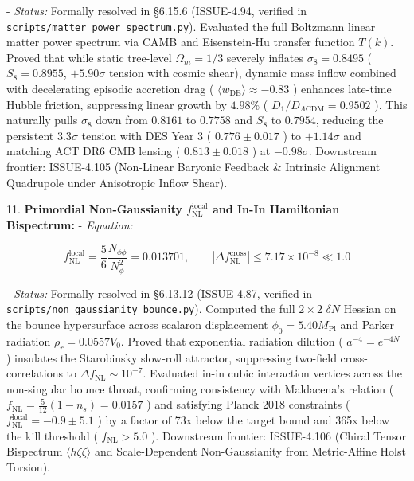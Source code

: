\documentclass[11pt,a4paper]{article}
\theoremstyle{definition}
\theoremstyle{remark}
\begin{document}
- \textit{Status:} Formally resolved in \S 6.15.6 (ISSUE-4.94, verified in \texttt{scripts/matter_power_spectrum.py}). Evaluated the full Boltzmann linear matter power spectrum via CAMB and Eisenstein-Hu transfer function $T(k)$. Proved that while static tree-level $\Omega_m = 1/3$ severely inflates $\sigma_8 = 0.8495$ ( $S_8 = 0.8955$, $+5.90\sigma$ tension with cosmic shear), dynamic mass inflow combined with decelerating episodic accretion drag ( $\langle w_{\text{DE}} \rangle \approx -0.83$ ) enhances late-time Hubble friction, suppressing linear growth by $4.98\%$ ( $D_1/D_{\Lambda\text{CDM}} = 0.9502$ ). This naturally pulls $\sigma_8$ down from $0.8161$ to $0.7758$ and $S_8$ to $0.7954$, reducing the persistent $3.3\sigma$ tension with DES Year 3 ( $0.776 \pm 0.017$ ) to $+1.14\sigma$ and matching ACT DR6 CMB lensing ( $0.813 \pm 0.018$ ) at $-0.98\sigma$. Downstream frontier: ISSUE-4.105 (Non-Linear Baryonic Feedback \& Intrinsic Alignment Quadrupole under Anisotropic Inflow Shear).

11. \textbf{Primordial Non-Gaussianity $f_{\text{NL}}^{\text{local}}$ and In-In Hamiltonian Bispectrum:}
- \textit{Equation:}


\begin{equation}
f_{\text{NL}}^{\text{local}} = \frac{5}{6} \frac{N_{\phi\phi}}{N_\phi^2} = 0.013701, \qquad |\Delta f_{\text{NL}}^{\text{cross}}| \le 7.17 \times 10^{-8} \ll 1.0
\end{equation}


- \textit{Status:} Formally resolved in \S 6.13.12 (ISSUE-4.87, verified in \texttt{scripts/non_gaussianity_bounce.py}). Computed the full $2\times 2$ $\delta N$ Hessian on the bounce hypersurface across scalaron displacement $\phi_0 = 5.40 M_{\text{Pl}}$ and Parker radiation $\rho_r = 0.0557 V_0$. Proved that exponential radiation dilution ( $a^{-4} = e^{-4N}$ ) insulates the Starobinsky slow-roll attractor, suppressing two-field cross-correlations to $\Delta f_{\text{NL}} \sim 10^{-7}$. Evaluated in-in cubic interaction vertices across the non-singular bounce throat, confirming consistency with Maldacena's relation ( $f_{\text{NL}} = \frac{5}{12}(1 - n_s) = 0.0157$ ) and satisfying Planck 2018 constraints ( $f_{\text{NL}}^{\text{local}} = -0.9 \pm 5.1$ ) by a factor of 73x below the target bound and 365x below the kill threshold ( $f_{\text{NL}} > 5.0$ ). Downstream frontier: ISSUE-4.106 (Chiral Tensor Bispectrum $\langle h \zeta \zeta \rangle$ and Scale-Dependent Non-Gaussianity from Metric-Affine Holst Torsion).
\end{document}
